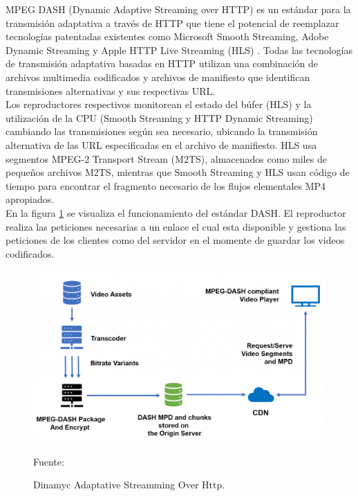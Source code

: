 MPEG DASH (Dynamic Adaptive Streaming over HTTP) es un estándar para la transmisión adaptativa a través de HTTP que tiene el potencial de reemplazar tecnologías patentadas existentes como Microsoft Smooth Streaming, Adobe Dynamic Streaming y Apple HTTP Live Streaming (HLS) \cite{dash_streamingmedia}. Todas las tecnologías de transmisión adaptativa basadas en HTTP utilizan una combinación de archivos multimedia codificados y archivos de manifiesto que identifican transmisiones alternativas y sus respectivas URL.\\

Los reproductores respectivos monitorean el estado del búfer (HLS) y la utilización de la CPU (Smooth Streaming y HTTP Dynamic Streaming) cambiando las transmisiones según sea necesario, ubicando la transmisión alternativa de las URL especificadas en el archivo de manifiesto. HLS usa segmentos MPEG-2 Transport Stream (M2TS), almacenados como miles de pequeños archivos M2TS, mientras que Smooth Streaming y HLS usan código de tiempo para encontrar el fragmento necesario de los flujos elementales MP4 apropiados.\\

En la figura \ref{fig:dash} se visualiza el funcionamiento del estándar DASH. El reproductor realiza las peticiones necesarias a un enlace el cual esta disponible y gestiona las peticiones de los clientes como del servidor en el momente de guardar los videos codificados.\\

\begin{figure}[H]
    \begin{center}
        \includegraphics[width=13cm]{img/capitulo_2/dash.png}
        \caption{Dinamyc Adaptative Streamming Over Http.\\}
        Fuente: \cite{dash}
        \label{fig:dash}
    \end{center}
\end{figure}

